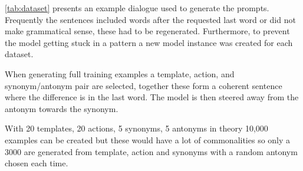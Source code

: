 \cref{tab:dataset} presents an example dialogue used to generate the prompts.
Frequently the sentences included words after the requested last word or did not make grammatical sense, these had to be regenerated.
Furthermore, to prevent the model getting stuck in a pattern a new model instance was created for each dataset.

When generating full training examples a template, action, and synonym/antonym pair are selected, together these form a coherent sentence where the difference is in the last word.
The model is then steered away from the antonym towards the synonym.

With 20 templates, 20 actions, 5 synonyms, 5 antonyms in theory 10,000 examples can be created but these would have a lot of commonalities so only a 3000 are generated from template, action and synonyms with a random antonym chosen each time.
